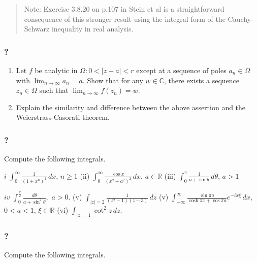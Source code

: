\begin{quote}
Note: Exercise 3.8.20 on p.107 in Stein et al is a straightforward
consequence of this stronger result using the integral form of the
Cauchy-Schwarz inequality in real analysis.
\end{quote}

\hypertarget{section-163}{%
\subsubsection{?}\label{section-163}}

\begin{enumerate}
\def\labelenumi{(\arabic{enumi})}
\item
  Let \(f\) be analytic in \(\Omega: 0<|z-a|<r\) except at a sequence of
  poles \(a_n \in \Omega\) with \(\lim_{n \rightarrow \infty} a_n = a\).
  Show that for any \(w \in \mathbb C\), there exists a sequence
  \(z_n \in \Omega\) such that
  \(\lim_{n \rightarrow \infty} f(z_n) = w\).
\item
  Explain the similarity and difference between the above assertion and
  the Weierstrass-Casorati theorem.
\end{enumerate}

\hypertarget{section-164}{%
\subsubsection{?}\label{section-164}}

Compute the following integrals.

\(i\) \(\displaystyle \int_0^\infty \frac{1}{(1 + x^n)^2} \, dx\),
\(n \geq 1\) (ii)
\(\displaystyle \int_0^\infty \frac{\cos x}{(x^2 + a^2)^2} \, dx\),
\(a \in \mathbb R\) (iii)
\(\displaystyle \int_0^\pi \frac{1}{a + \sin \theta} \, d \theta\),
\(a>1\)

\(iv\)
\(\displaystyle \int_0^{\frac{\pi}{2}} \frac{d \theta}{a+ \sin ^2 \theta},\)
\(a >0\). (v)
\(\displaystyle \int_{|z|=2} \frac{1}{(z^{5} -1) (z-3)} \, dz\) (v)
\(\displaystyle \int_{- \infty}^{\infty} \frac{\sin \pi a}{\cosh \pi x + \cos \pi a} e^{- i x \xi} \, d x\),
\(0< a <1\), \(\xi \in \mathbb R\) (vi)
\(\displaystyle \int_{|z| = 1} \cot^2 z \, dz\).

\hypertarget{section-165}{%
\subsubsection{?}\label{section-165}}

Compute the following integrals.

